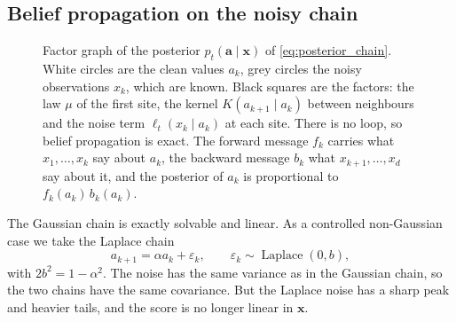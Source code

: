 \documentclass{article}
\begin{document}
\subsection{Belief propagation on the noisy chain}
\label{sec:tree}

\begin{figure}[t]
  \centering
  
  \caption{Factor graph of the posterior $p_t(\mathbf a\mid\mathbf x)$ of \cref{eq:posterior_chain}. White circles are
  the clean values $a_k$, grey circles the noisy observations $x_k$, which are known. Black squares are the factors: the
  law $\mu$ of the first site, the kernel $K(a_{k+1}\mid a_k)$ between neighbours and the noise term
  $\ell_t(x_k\mid a_k)$ at each site. There is no loop, so belief propagation is exact. The forward message $f_k$ carries
  what $x_1,\ldots,x_k$ say about $a_k$, the backward message $b_k$ what $x_{k+1},\ldots,x_d$ say about it, and the
  posterior of $a_k$ is proportional to $f_k(a_k)\,b_k(a_k)$.}
  \label{fig:factor-graph}
\end{figure}

The Gaussian chain is exactly solvable and linear. As a controlled non-Gaussian case we take the Laplace chain
\begin{equation}
    a_{k+1}=\alpha a_k+\varepsilon_k,
    \qquad
    \varepsilon_k\sim\operatorname{Laplace}(0,b),
    \label{eq:laplace_chain}
\end{equation}
with $2b^2=1-\alpha^2$. The noise has the same variance as in the Gaussian chain, so the two chains have the same
covariance. But the Laplace noise has a sharp peak and heavier tails, and the score is no longer linear in $\mathbf x$.
\end{document}
